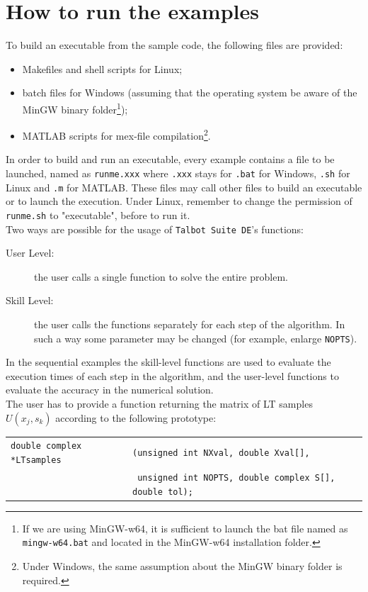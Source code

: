 \documentclass[a4paper,10pt]{report}%
\begin{document}
\section{How to run the examples}\label{HOW:TO:RUN}
To build an executable from the sample code, the following files are provided:
\begin{itemize}
\item Makefiles and shell scripts for Linux;
\item batch files for Windows (assuming that the operating system be aware of the MinGW binary
folder\footnote{ If we are using MinGW-w64, it is sufficient to launch the bat file named as
{\tt mingw-w64.bat} and located in the MinGW-w64 installation folder.});
\item MATLAB scripts for mex-file compilation\footnote{ Under Windows, the same assumption about the MinGW binary folder is required.}.
\end{itemize}
In order to build and run an executable, every example contains a file to be launched, named as {\tt runme.xxx} where
{\tt .xxx} stays for {\tt .bat} for Windows, {\tt .sh} for Linux and {\tt .m} for MATLAB.
These files may call other files to build an executable or to launch the execution. Under Linux, remember to change the permission of {\tt runme.sh} to "executable", before to run it.
\\
Two ways are possible for the usage of {\tt Talbot Suite DE}'s functions:
\begin{description}
\item[User Level:]  the user calls a single function to solve the entire problem.
\item[Skill Level:] the user calls the functions separately for each step of the algorithm. In such a way some parameter may be changed (for example, enlarge {\tt NOPTS}).
\end{description}
In the sequential examples the skill-level functions are used to evaluate the execution times of each step in the algorithm, and the user-level functions to evaluate the accuracy in the numerical solution.
\\[.15in]
\indent The user has to provide a function returning the matrix of LT samples $U(x_j,s_k)$ according to the following prototype:
\begin{center}
{\small\begin{tabular}{ll}
{\tt double complex *LTsamples} & {\tt (unsigned int NXval, double Xval[],} \\
                                & {\tt\ unsigned int NOPTS, double complex S[], double tol);}
\end{tabular}}
\end{center}
\end{document}
